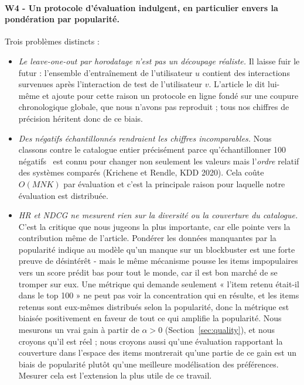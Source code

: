 \paragraph{W4 - Un protocole d'évaluation indulgent, en particulier envers la
pondération par popularité.} Trois problèmes distincts :
\begin{itemize}\itemsep2pt
\item \emph{Le leave-one-out par horodatage n'est pas un découpage réaliste.} Il
laisse fuir le futur : l'ensemble d'entraînement de l'utilisateur $u$ contient des
interactions survenues après l'interaction de test de l'utilisateur $v$. L'article le
dit lui-même et ajoute pour cette raison un protocole en ligne fondé sur une coupure
chronologique globale, que nous n'avons pas reproduit ; tous nos chiffres de précision
héritent donc de ce biais.
\item \emph{Des négatifs échantillonnés rendraient les chiffres incomparables.} Nous
classons contre le catalogue entier précisément parce qu'échantillonner 100 négatifs~\cite{krichene2020sampled}
est connu pour changer non seulement les valeurs mais l'\emph{ordre} relatif des
systèmes comparés (Krichene et Rendle, KDD 2020). Cela coûte $O(MNK)$ par évaluation et c'est
la principale raison pour laquelle notre évaluation est distribuée.
\item \emph{HR et NDCG ne mesurent rien sur la diversité ou la couverture du
catalogue.} C'est la critique que nous jugeons la plus importante, car elle pointe
vers la contribution même de l'article. Pondérer les données manquantes par la
popularité indique au modèle qu'un manque sur un blockbuster est une forte preuve de
désintérêt - mais le même mécanisme pousse les items impopulaires vers un score
prédit bas pour tout le monde, car il est bon marché de se tromper sur eux. Une
métrique qui demande seulement « l'item retenu était-il dans le top 100 » ne peut pas
voir la concentration qui en résulte, et les items retenus sont eux-mêmes distribués
selon la popularité, donc la métrique est biaisée positivement en faveur de tout ce
qui amplifie la popularité. Nous mesurons un vrai
gain à partir de $\alpha>0$ (Section~\ref{sec:quality}), et nous croyons qu'il est réel ;
nous croyons aussi qu'une évaluation rapportant la couverture dans l'espace des items
montrerait qu'une partie de ce gain est un biais de popularité plutôt qu'une
meilleure modélisation des préférences. Mesurer cela est l'extension la plus utile de
ce travail.
\end{itemize}

